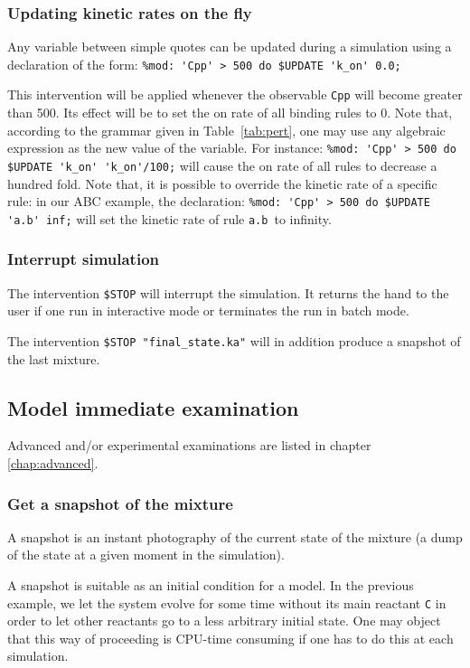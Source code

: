 \documentclass[11pt]{book}
\def\ttt#1{\texttt{#1}}
\def\var#1{{\textquotesingle}#1{\textquotesingle}}
\def\noi{\noindent}
\begin{document}
\subsubsection{Updating kinetic rates on the fly}

Any variable between simple quotes can be updated during a simulation using a declaration of the form:
\lstinline[language=kappa]!%mod: 'Cpp' > 500 do $UPDATE 'k_on' 0.0;!

This intervention will be applied whenever the observable \ttt{\var{Cpp}} will become greater than 500. Its effect will be to set the on rate of all binding rules to 0. Note that, according to the grammar given in Table~\ref{tab:pert}, one may use any algebraic expression as the new value of the variable. For instance:
\lstinline[language=kappa]!%mod: 'Cpp' > 500 do $UPDATE 'k_on' 'k_on'/100;!
\noi will cause the on rate of all rules to decrease a hundred fold. Note that, it is possible to override the kinetic rate of a specific rule:  in our ABC example, the declaration:
\lstinline[language=kappa]!%mod: 'Cpp' > 500 do $UPDATE 'a.b' inf;!
\noi will set the kinetic rate of rule \ttt{\var{a.b}}~to infinity.

\subsubsection{Interrupt simulation}
The intervention \ttt{\$STOP} will interrupt the simulation. It
returns the hand to the user if one run in interactive mode or
terminates the run in batch mode.

The intervention \ttt{\$STOP "final\_state.ka"} will in addition
produce a snapshot of the last mixture.

\subsection{Model immediate examination}
Advanced and/or experimental examinations are listed in chapter \ref{chap:advanced}.

\subsubsection{Get a snapshot of the mixture}

A snapshot is an instant photography of the current state of the
mixture (a dump of the state at a given moment in the simulation).

A snapshot is suitable as an initial condition for a model.
In the previous example, we let the system evolve for some time
without its main reactant \ttt{C} in order to let other reactants go
to a less arbitrary initial state. One may object that this way of
proceeding is CPU-time consuming if one has to do this at each
simulation.
\end{document}
